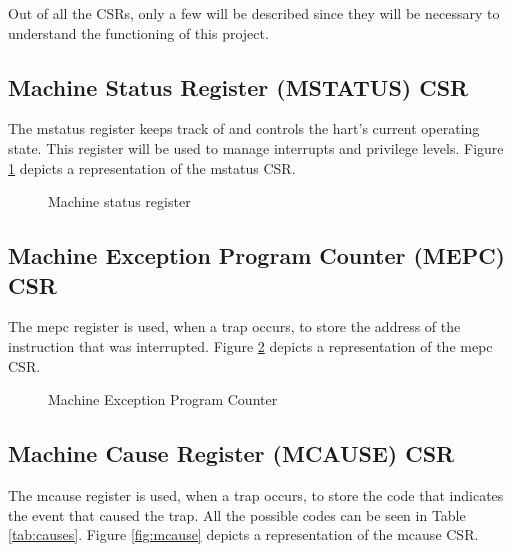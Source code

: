 Out of all the CSRs, only a few will be described since they will be necessary to
understand the functioning of this project.

\subsection{Machine Status Register (MSTATUS) CSR}
\label{subsec:mstatus}

The mstatus register keeps track of and controls the hart’s current operating
state. This register will be used to manage interrupts and privilege levels.
Figure \ref{fig:mstatus} depicts a representation of the mstatus CSR.

\begin{figure}[htbp]
  \centering
  \def\stackalignment{r} %
  {\scriptsize }
  \caption{Machine status register}
  \label{fig:mstatus}
\end{figure}

\subsection{Machine Exception Program Counter (MEPC) CSR}
\label{subsec:mepc}

The mepc register is used, when a trap occurs, to store the address of the
instruction that was interrupted. Figure \ref{fig:mepc} depicts a representation
of the mepc CSR.

\begin{figure}[htbp]
  \centering
  \def\stackalignment{r} %
  {\scriptsize }
  \caption{Machine Exception Program Counter}
  \label{fig:mepc}
\end{figure}

\subsection{Machine Cause Register (MCAUSE) CSR}
\label{subsec:mcause}

The mcause register is used, when a trap occurs, to store the code that indicates
the event that caused the trap. All the possible codes can be seen in Table
\ref{tab:causes}. Figure \ref{fig:mcause} depicts a representation of the mcause
CSR.

